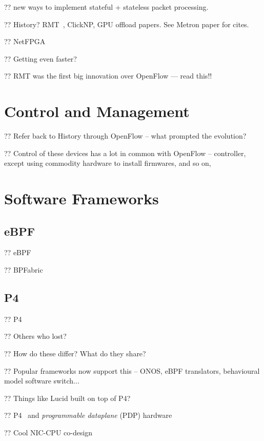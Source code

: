 ?? new ways to implement stateful + stateless packet processing.

?? History? RMT~\parencite{DBLP:conf/sigcomm/BosshartGKVMIMH13}, ClickNP, GPU offload papers. See Metron paper for cites.

?? NetFPGA~\parencite{DBLP:conf/fpga/IbanezBMZ19}

?? Getting even faster?~\parencite{nokia-fp5}


?? RMT was the first big innovation over OpenFlow --- read this!!

\section{Control and Management}

?? Refer back to History through OpenFlow -- what prompted the evolution?

?? Control of these devices has a lot in common with OpenFlow -- controller, except using commodity hardware to install firmwares, and so on,

\section{Software Frameworks}

\subsection{eBPF}
?? eBPF

?? BPFabric

\subsection{P4}
?? P4

?? Others who lost?

?? How do these differ? What do they share?

?? Popular frameworks now support this -- ONOS, eBPF translators, behavioural model software switch...

?? Things like Lucid built on top of P4?~\parencite{DBLP:conf/sigcomm/SonchackLRW21}

?? P4~\parencite{DBLP:journals/ccr/BosshartDGIMRSTVVW14} and \emph{programmable dataplane} (PDP) hardware~\parencite{DBLP:journals/micro/ZilbermanACM14, netronome-smartnic, xilinx-alveo, barefoot-intel}

?? Cool NIC-CPU co-design~\parencite{DBLP:conf/osdi/IbanezMAJ0KM21}

